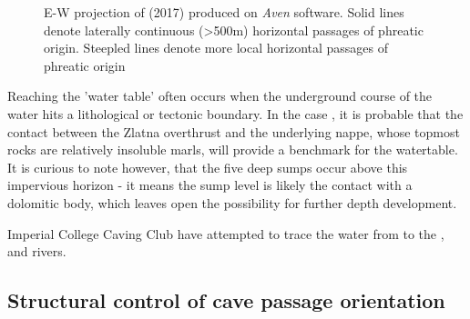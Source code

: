 \begin{figure}[t!]
 \checkoddpage \ifoddpage \forcerectofloat \else \forceversofloat \fi
\centering
{}
\caption{E-W projection of \protect{} (2017) produced on \emph{Aven} software. Solid lines denote laterally continuous (>500m) horizontal passages of phreatic origin. Steepled lines denote more local horizontal passages of phreatic origin} \label{fig:ew projection}
\end{figure}



Reaching the 'water table' often occurs when the underground course of the water hits a lithological or tectonic boundary. In the case , it is probable that the contact between the Zlatna overthrust and the underlying  nappe, whose topmost rocks are relatively insoluble marls, will provide a benchmark for the watertable. It is curious to note however, that the five deep sumps occur above this impervious horizon - it means the sump level is likely the contact with a dolomitic body, which leaves open the possibility for further depth development. 

Imperial College Caving Club have attempted to trace the water from  \citep{hm1} to the ,  and  rivers.
 
 
 \subsection{Structural control of cave passage orientation}
